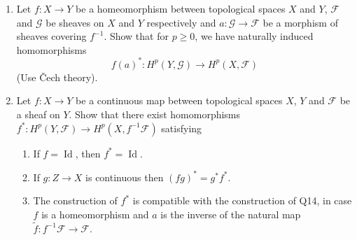 \begin{enumerate}
\[
0\to f_*\mathcal F\to f_*\mathcal G\to f_*\mathcal H\to R^1f_*\mathcal F\to R^1f_*\mathcal G\to\cdots
\]
is exact.
\setcounter{enumi}{13}
\item Let $f:X\to Y$ be a homeomorphism between topological spaces $X$ and $Y$, $\mathcal F$ and $\mathcal G$ be sheaves on $X$ and $Y$ respectively and $a:\mathcal G\to\mathcal F$ be a morphism of sheaves covering $f^{-1}$. Show that for $p\geq0$, we have naturally induced homomorphisms
\[
f(a)^*:H^p(Y,\mathcal G)\to H^p(X,\mathcal F)
\]
(Use \v{C}ech theory).
\item Let $f:X\to Y$ be a continuous map between topological spaces $X$, $Y$ and $\mathcal F$ be a sheaf on $Y$. Show that there exist homomorphisms $f^*:H^p(Y,\mathcal F)\to H^p(X,f^{-1}\mathcal F)$ satisfying
\begin{enumerate}[label=\alph*)]
\item If $f=\operatorname{Id}$, then $f^*=\operatorname{Id}$.
\item If $g:Z\to X$ is continuous then $(fg)^*=g^*f^*$.
\item The construction of $f^*$ is compatible with the construction of Q14, in case $f$ is a homeomorphism and $a$ is the inverse of the natural map $\widetilde f:f^{-1}\mathcal F\to\mathcal F$.
\end{enumerate}
\end{enumerate}
